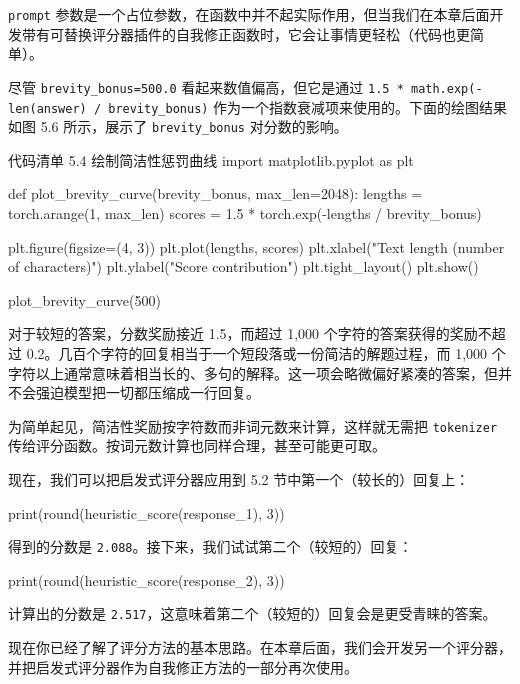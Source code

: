 \texttt{prompt} 参数是一个占位参数，在函数中并不起实际作用，但当我们在本章后面开发带有可替换评分器插件的自我修正函数时，它会让事情更轻松（代码也更简单）。

尽管 \texttt{brevity\_bonus=500.0} 看起来数值偏高，但它是通过 \texttt{1.5 * math.exp(-len(answer) / brevity\_bonus)} 作为一个指数衰减项来使用的。下面的绘图结果如图 5.6 所示，展示了 \texttt{brevity\_bonus} 对分数的影响。

\begin{codeboxt}{代码清单 5.4 绘制简洁性惩罚曲线}
import matplotlib.pyplot as plt

def plot_brevity_curve(brevity_bonus, max_len=2048):
    lengths = torch.arange(1, max_len)
    scores = 1.5 * torch.exp(-lengths / brevity_bonus)

    plt.figure(figsize=(4, 3))
    plt.plot(lengths, scores)
    plt.xlabel("Text length (number of characters)")
    plt.ylabel("Score contribution")
    plt.tight_layout()
    plt.show()

plot_brevity_curve(500)
\end{codeboxt}


对于较短的答案，分数奖励接近 1.5，而超过 1,000 个字符的答案获得的奖励不超过 0.2。几百个字符的回复相当于一个短段落或一份简洁的解题过程，而 1,000 个字符以上通常意味着相当长的、多句的解释。这一项会略微偏好紧凑的答案，但并不会强迫模型把一切都压缩成一行回复。

为简单起见，简洁性奖励按字符数而非词元数来计算，这样就无需把 \texttt{tokenizer} 传给评分函数。按词元数计算也同样合理，甚至可能更可取。

现在，我们可以把启发式评分器应用到 5.2 节中第一个（较长的）回复上：

\begin{codebox}
print(round(heuristic_score(response_1), 3))
\end{codebox}

得到的分数是 \texttt{2.088}。接下来，我们试试第二个（较短的）回复：

\begin{codebox}
print(round(heuristic_score(response_2), 3))
\end{codebox}

计算出的分数是 \texttt{2.517}，这意味着第二个（较短的）回复会是更受青睐的答案。

现在你已经了解了评分方法的基本思路。在本章后面，我们会开发另一个评分器，并把启发式评分器作为自我修正方法的一部分再次使用。

